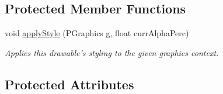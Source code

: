 \subsection*{Protected Member Functions}
\begin{DoxyCompactItemize}
\item 
void \hyperlink{classhype_1_1drawable_1_1_h_drawable_a1888aed57c719a397222b9e82ed08a4e}{apply\-Style} (P\-Graphics g, float curr\-Alpha\-Perc)
\begin{DoxyCompactList}\small\item\em Applies this drawable's styling to the given graphics context. \end{DoxyCompactList}\end{DoxyCompactItemize}
\subsection*{Protected Attributes}
